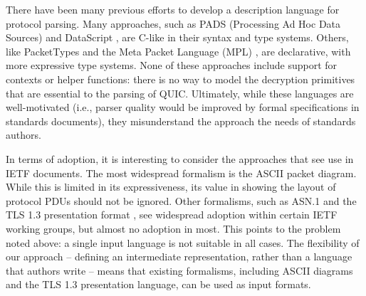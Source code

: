 \documentclass[10pt,sigconf]{acmart}
\begin{document}
%
% 

There have been many previous efforts to develop a description language for protocol
parsing. Many approaches, such as PADS (Processing Ad Hoc Data Sources)
\cite{fisher2005pads} and DataScript \cite{back2002datascript}, are C-like in their
syntax and type systems. Others, like PacketTypes \cite{mccann2000packet} and the Meta
Packet Language (MPL) \cite{madhavapeddy2007melange}, are declarative, with more expressive
type systems. None of these approaches include support for contexts or helper functions:
there is no way to model the decryption primitives that are essential to the parsing of
QUIC. Ultimately, while these languages are well-motivated (i.e., parser quality would
be improved by formal specifications in standards documents), they misunderstand the
approach the needs of standards authors. 

In terms of adoption, it is interesting to consider the approaches that see use in IETF
documents. The most widespread formalism is the ASCII packet diagram. While this is
limited in its expressiveness, its value in showing the layout of protocol PDUs should not
be ignored. Other formalisms, such as ASN.1 \cite{x680} and the TLS 1.3 presentation
format \cite{draft-ietf-tls-tls13-28}, see widespread adoption within certain IETF
working groups, but almost no adoption in most. This points to the problem noted above: a
single input language is not suitable in all cases. The flexibility of our approach --
defining an intermediate representation, rather than a language that authors write -- means
that existing formalisms, including ASCII diagrams and the TLS 1.3 presentation language,
can be used as input formats. 
\end{document}
